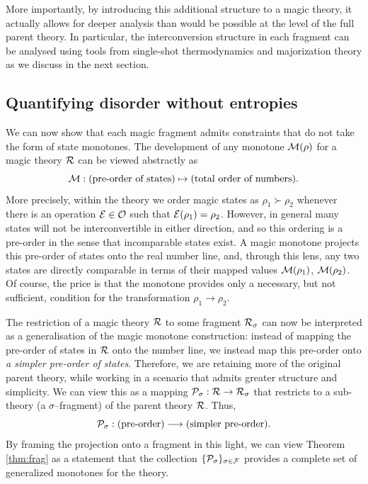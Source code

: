 \documentclass[pra,
aps,
twocolumn,
superscriptaddress,
groupedaddress,
nofootinbib,
reprint
]{revtex4-1}
\begin{document}
More importantly, by introducing this additional structure to a magic theory, it actually allows for deeper analysis than would be possible at the level of the full parent theory. In particular, the interconversion structure in each fragment can be analysed using tools from single-shot thermodynamics and majorization theory as we discuss in the next section.

\subsection{Quantifying disorder without entropies}
\label{sec:major}

We can now show that each magic fragment admits constraints that do not take the form of state monotones. 
The development of any monotone $\M(\rho)$ for a magic theory $\R$ can be viewed abstractly as
\begin{equation}
\M : \mbox{(pre-order of states)} \mapsto \mbox{(total order of numbers).} \nonumber
\end{equation}
More precisely, within the theory we order magic states as $\rho_1 \succ \rho_2$ whenever there is an operation $\E \in \O$ such that $\E(\rho_1) = \rho_2$. However, in general many states will not be interconvertible in either direction, and so this ordering is a pre-order in the sense that incomparable states exist. A magic monotone projects this pre-order of states onto the real number line, and, through this lens, any two states are directly comparable in terms of their mapped values $\M(\rho_1)$, $\M(\rho_2)$. Of course, the price is that the monotone provides only a necessary, but not sufficient, condition for the transformation $\rho_1 \rightarrow \rho_2$.

The restriction of a magic theory $\R$ to some fragment $\R_\sigma$ can now be interpreted as a generalisation of the magic monotone construction: instead of mapping the pre-order of states in $\R$ onto the number line, we instead map this pre-order onto \emph{a simpler pre-order of states}. Therefore, we are retaining more of the original parent theory, while working in a scenario that admits greater structure and simplicity. We can view this as a mapping $\P_\sigma: \R \rightarrow \R_\sigma$ that restricts to a sub-theory (a $\sigma$--fragment) of the parent theory $\R$. Thus,
\begin{equation}
\P_\sigma: \mbox{(pre-order)} \longrightarrow \mbox{(simpler pre-order).}
\end{equation}
By framing the projection onto a fragment in this light, we can view Theorem \ref{thm:frag} as a statement that the collection $\{\P_\sigma\}_{\sigma \in \F}$ provides a complete set of generalized monotones for the theory.
\end{document}
